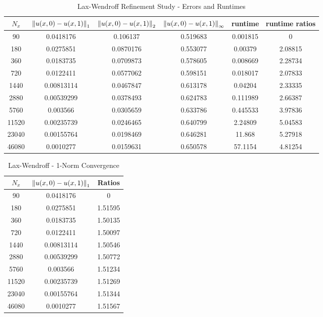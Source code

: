 \documentclass[12pt]{article}
\begin{document}
\begin{table}[H]
\caption{Lax-Wendroff Refinement Study - Errors and Runtimes}
\begin{tabular}{||c|ccc|cc||}
\hline \hline
    $N_x$ & $\norm{u(x,0)-u(x,1)}_1$ & $\norm{u(x,0)-u(x,1)}_2$ & $\norm{u(x,0)-u(x,1)}_{\infty}$ &   runtime &   runtime ratios \\
\hline
    90 &     0.0418176  &      0.106137  &         0.519683 &  0.001815 &          0       \\
   180 &     0.0275851  &      0.0870176 &         0.553077 &  0.00379  &          2.08815 \\
   360 &     0.0183735  &      0.0709873 &         0.578605 &  0.008669 &          2.28734 \\
   720 &     0.0122411  &      0.0577062 &         0.598151 &  0.018017 &          2.07833 \\
  1440 &     0.00813114 &      0.0467847 &         0.613178 &  0.04204  &          2.33335 \\
  2880 &     0.00539299 &      0.0378493 &         0.624783 &  0.111989 &          2.66387 \\
  5760 &     0.003566   &      0.0305659 &         0.633786 &  0.445533 &          3.97836 \\
 11520 &     0.00235739 &      0.0246465 &         0.640799 &  2.24809  &          5.04583 \\
 23040 &     0.00155764 &      0.0198469 &         0.646281 & 11.868    &          5.27918 \\
 46080 &     0.0010277  &      0.0159631 &         0.650578 & 57.1154   &          4.81254 \\
\hline \hline
\end{tabular}
\end{table}
\begin{minipage}{0.5\textwidth}
\begin{table}[H]
\caption{Lax-Wendroff - 1-Norm Convergence}
\centering\begin{tabular}{||c|cc||}
\hline \hline
    $N_x$ & $\norm{u(x,0)-u(x,1)}_1$ &  Ratios \\
\hline
    90 &     0.0418176  &  0       \\
   180 &     0.0275851  &  1.51595 \\
   360 &     0.0183735  &  1.50135 \\
   720 &     0.0122411  &  1.50097 \\
  1440 &     0.00813114 &  1.50546 \\
  2880 &     0.00539299 &  1.50772 \\
  5760 &     0.003566   &  1.51234 \\
 11520 &     0.00235739 &  1.51269 \\
 23040 &     0.00155764 &  1.51344 \\
 46080 &     0.0010277  &  1.51567 \\
\hline
\end{tabular}\end{table}
\end{minipage}
\end{document}
